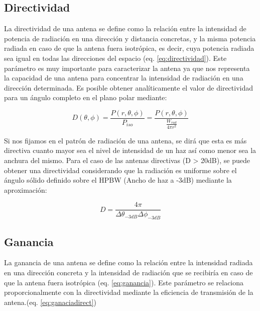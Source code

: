 \subsection{Directividad}

\par La directividad de una antena se define como la relación entre la intensidad de potencia de radiación en una dirección y distancia concretas, y la misma potencia radiada en caso de que la antena fuera isotrópica, es decir, cuya potencia radiada sea igual en todas las direcciones del espacio (eq. \ref{eq:directividad}). Este parámetro es muy importante para caracterizar la antena ya que nos representa la capacidad de una antena para concentrar la intensidad de radiación en una dirección determinada. Es posible obtener analíticamente el valor de directividad para un ángulo completo en el plano polar mediante:

\begin{equation}
	D(\theta, \phi )=\frac{P(r,\theta ,\phi)}{P_{iso}}= \frac{P(r,\theta ,\phi)}{\frac{W_{rad}}{4\pi r^{2}}}
	\label{eq:directividad}
\end{equation}

\par Si nos fijamos en el patrón de radiación de una antena, se dirá que esta es más directiva cuanto mayor sea el nivel de intensidad de un haz así como menor sea la anchura del mismo. Para el caso de las antenas directivas (D > 20dB), se puede obtener una directividad considerando que la radiación es uniforme sobre el ángulo sólido definido sobre el HPBW (Ancho de haz a -3dB) mediante la aproximación:

\begin{equation}
	D=\frac{4\pi}{\Delta \theta _{-3dB} \Delta \phi _{-3dB}}
	\label{eq:directividadaprox}
\end{equation}

\subsection{Ganancia}

\par La ganancia de una antena se define como la relación entre la intensidad radiada en una dirección concreta y la intensidad de radiación que se recibiría en caso de que la antena fuera isotrópica (eq. \ref{eq:ganancia}). Este parámetro se relaciona proporcionalmente con la directividad mediante la eficiencia de transmisión de la antena.(eq. \ref{eq:ganaciadirect})


